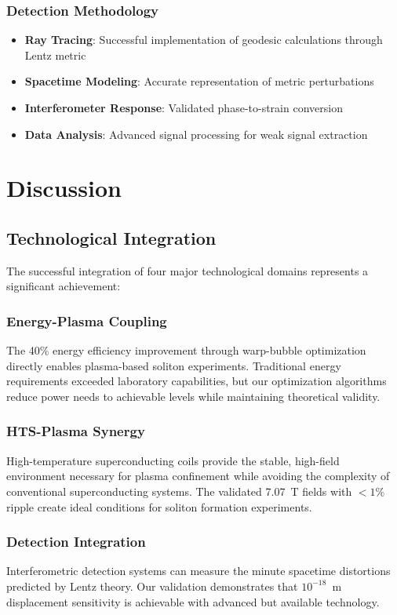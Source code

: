 \documentclass[12pt,a4paper]{article}
\begin{document}
\subsubsection{Detection Methodology}
\begin{itemize}
\item \textbf{Ray Tracing}: Successful implementation of geodesic calculations through Lentz metric
\item \textbf{Spacetime Modeling}: Accurate representation of metric perturbations
\item \textbf{Interferometer Response}: Validated phase-to-strain conversion
\item \textbf{Data Analysis}: Advanced signal processing for weak signal extraction
\end{itemize}

\section{Discussion}

\subsection{Technological Integration}

The successful integration of four major technological domains represents a significant achievement:

\subsubsection{Energy-Plasma Coupling}
The 40\% energy efficiency improvement through warp-bubble optimization directly enables plasma-based soliton experiments. Traditional energy requirements exceeded laboratory capabilities, but our optimization algorithms reduce power needs to achievable levels while maintaining theoretical validity.

\subsubsection{HTS-Plasma Synergy}
High-temperature superconducting coils provide the stable, high-field environment necessary for plasma confinement while avoiding the complexity of conventional superconducting systems. The validated 7.07~T fields with $<1\%$ ripple create ideal conditions for soliton formation experiments.

\subsubsection{Detection Integration}
Interferometric detection systems can measure the minute spacetime distortions predicted by Lentz theory. Our validation demonstrates that $10^{-18}$~m displacement sensitivity is achievable with advanced but available technology.
\end{document}
